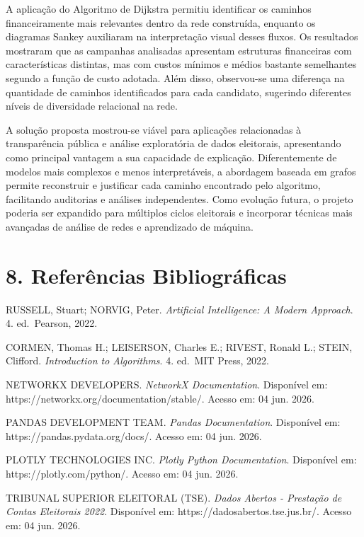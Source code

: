 \documentclass[11pt]{article}
\begin{document}
A aplicação do Algoritmo de Dijkstra permitiu identificar os caminhos
financeiramente mais relevantes dentro da rede construída, enquanto os
diagramas Sankey auxiliaram na interpretação visual desses fluxos. Os
resultados mostraram que as campanhas analisadas apresentam estruturas
financeiras com características distintas, mas com custos mínimos e
médios bastante semelhantes segundo a função de custo adotada. Além
disso, observou-se uma diferença na quantidade de caminhos identificados
para cada candidato, sugerindo diferentes níveis de diversidade
relacional na rede.

A solução proposta mostrou-se viável para aplicações relacionadas à
transparência pública e análise exploratória de dados eleitorais,
apresentando como principal vantagem a sua capacidade de explicação.
Diferentemente de modelos mais complexos e menos interpretáveis, a
abordagem baseada em grafos permite reconstruir e justificar cada
caminho encontrado pelo algoritmo, facilitando auditorias e análises
independentes. Como evolução futura, o projeto poderia ser expandido
para múltiplos ciclos eleitorais e incorporar técnicas mais avançadas de
análise de redes e aprendizado de máquina.

    \section{8. Referências
Bibliográficas}\label{referuxeancias-bibliogruxe1ficas}

RUSSELL, Stuart; NORVIG, Peter. \emph{Artificial Intelligence: A Modern
Approach}. 4. ed.~Pearson, 2022.

CORMEN, Thomas H.; LEISERSON, Charles E.; RIVEST, Ronald L.; STEIN,
Clifford. \emph{Introduction to Algorithms}. 4. ed.~MIT Press, 2022.

NETWORKX DEVELOPERS. \emph{NetworkX Documentation}. Disponível em:
https://networkx.org/documentation/stable/. Acesso em: 04 jun. 2026.

PANDAS DEVELOPMENT TEAM. \emph{Pandas Documentation}. Disponível em:
https://pandas.pydata.org/docs/. Acesso em: 04 jun. 2026.

PLOTLY TECHNOLOGIES INC. \emph{Plotly Python Documentation}. Disponível
em: https://plotly.com/python/. Acesso em: 04 jun. 2026.

TRIBUNAL SUPERIOR ELEITORAL (TSE). \emph{Dados Abertos - Prestação de
Contas Eleitorais 2022}. Disponível em:
https://dadosabertos.tse.jus.br/. Acesso em: 04 jun. 2026.


    
    
    
\end{document}
